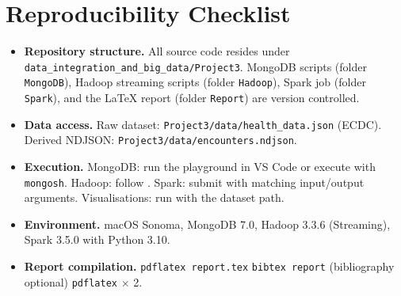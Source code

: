\documentclass[12pt, a4paper]{article}
\begin{document}
\section{Reproducibility Checklist}
\begin{itemize}[leftmargin=1.2cm]
    \item \textbf{Repository structure.} All source code resides under \texttt{data\_integration\_and\_big\_data/Project3}. MongoDB scripts (folder \texttt{MongoDB}), Hadoop streaming scripts (folder \texttt{Hadoop}), Spark job (folder \texttt{Spark}), and the LaTeX report (folder \texttt{Report}) are version controlled.
    \item \textbf{Data access.} Raw dataset: \texttt{Project3/data/health\_data.json} (ECDC). Derived NDJSON: \texttt{Project3/data/encounters.ndjson}.
    \item \textbf{Execution.} MongoDB: run the playground in VS Code or execute  with \texttt{mongosh}. Hadoop: follow . Spark: submit  with matching input/output arguments. Visualisations: run  with the dataset path.
    \item \textbf{Environment.} macOS Sonoma, MongoDB 7.0, Hadoop 3.3.6 (Streaming), Spark 3.5.0 with Python 3.10.
    \item \textbf{Report compilation.} \texttt{pdflatex report.tex} \textrightarrow{} \texttt{bibtex report} (bibliography optional) \textrightarrow{} \texttt{pdflatex} $\times$ 2.
\end{itemize}
\end{document}
